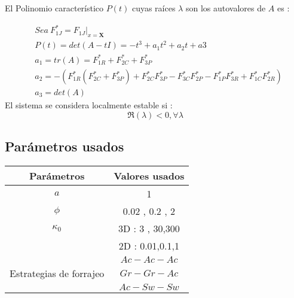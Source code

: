El Polinomio caracter\'istico $P(t)$ cuyas ra\'ices $\lambda$ son los autovalores de $A$ es :

\begin{equation}
\begin{aligned}
& Sea \ F^*_{1J} = \left. F_{1J}\right|_{x=\mathbf{X}} \\
&P(t) = det(A-tI) = - t^3 + a_1t^2 + a_2 t + a3 \\
& a_1 = tr(A) = F^*_{1R}  + F^*_{2C} + F^*_{3P} \\
& a_2 =  -(F^*_{1R}(F^*_{2C}+F^*_{3P}) + F^*_{2C}F^*_{3P} - F^*_{3C}F^*_{2P} - F^*_{1P}F^*_{3R} + F^*_{1C}F^*_{2R}) \\
& a_3 = det(A) 
\end{aligned}
\end{equation}
El sistema se considera localmente estable \citep{yodzis1989introduction} si :
\begin{equation}\label{eq:estab}
\Re(\lambda) < 0 , \forall  \lambda
\end{equation}

\subsection{Par\'ametros usados}\label{subsec:params}

\begin{longtable}{|c|c|}
\hline
Par\'ametros & Valores usados \\
\hline
$a$ & 1 \\
$\phi$ & 0.02 , 0.2 , 2 \\
\hline
$\kappa_0$ & 3D : 3 , 30,300 \\
   & 2D : 0.01,0.1,1 \\
\hline
& $Ac-Ac-Ac$ \\
Estrategias de forrajeo& $Gr-Gr-Ac$ \\
& $Ac-Sw-Sw$ \\
\hline
\end{longtable}
